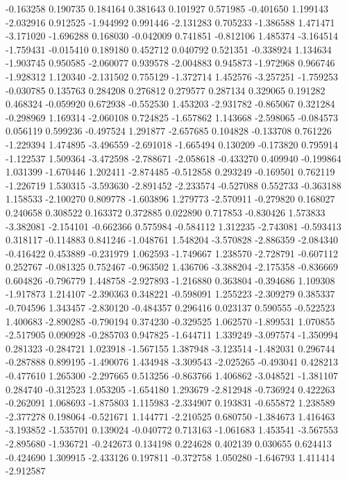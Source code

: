 -0.163258
0.190735
0.184164
0.381643
0.101927
0.571985
-0.401650
1.199143
-2.032916
0.912525
-1.944992
0.991446
-2.131283
0.705233
-1.386588
1.471471
-3.171020
-1.696288
0.168030
-0.042009
0.741851
-0.812106
1.485374
-3.164514
-1.759431
-0.015410
0.189180
0.452712
0.040792
0.521351
-0.338924
1.134634
-1.903745
0.950585
-2.060077
0.939578
-2.004883
0.945873
-1.972968
0.966746
-1.928312
1.120340
-2.131502
0.755129
-1.372714
1.452576
-3.257251
-1.759253
-0.030785
0.135763
0.284208
0.276812
0.279577
0.287134
0.329065
0.191282
0.468324
-0.059920
0.672938
-0.552530
1.453203
-2.931782
-0.865067
0.321284
-0.298969
1.169314
-2.060108
0.724825
-1.657862
1.143668
-2.598065
-0.084573
0.056119
0.599236
-0.497524
1.291877
-2.657685
0.104828
-0.133708
0.761226
-1.229394
1.474895
-3.496559
-2.691018
-1.665494
0.130209
-0.173820
0.795914
-1.122537
1.509364
-3.472598
-2.788671
-2.058618
-0.433270
0.409940
-0.199864
1.031399
-1.670446
1.202411
-2.874485
-0.512858
0.293249
-0.169501
0.762119
-1.226719
1.530315
-3.593630
-2.891452
-2.233574
-0.527088
0.552733
-0.363188
1.158533
-2.100270
0.809778
-1.603896
1.279773
-2.570911
-0.279820
0.168027
0.240658
0.308522
0.163372
0.372885
0.022890
0.717853
-0.830426
1.573833
-3.382081
-2.154101
-0.662366
0.575984
-0.584112
1.312235
-2.743081
-0.593413
0.318117
-0.114883
0.841246
-1.048761
1.548204
-3.570828
-2.886359
-2.084340
-0.416422
0.453889
-0.231979
1.062593
-1.749667
1.238570
-2.728791
-0.607112
0.252767
-0.081325
0.752467
-0.963502
1.436706
-3.388204
-2.175358
-0.836669
0.604826
-0.796779
1.448758
-2.927893
-1.216880
0.363804
-0.394686
1.109308
-1.917873
1.214107
-2.390363
0.348221
-0.598091
1.255223
-2.309279
0.385337
-0.704596
1.343457
-2.830120
-0.484357
0.296416
0.023137
0.590555
-0.522523
1.400683
-2.890285
-0.790194
0.374230
-0.329525
1.062570
-1.899531
1.070855
-2.517905
0.090928
-0.285703
0.947825
-1.644711
1.339249
-3.097574
-1.350994
0.281323
-0.284721
1.023918
-1.567155
1.387948
-3.123514
-1.482031
0.296744
-0.287888
0.899195
-1.490076
1.434948
-3.309543
-2.025265
-0.493041
0.428213
-0.477610
1.265300
-2.297665
0.513256
-0.863766
1.406862
-3.048521
-1.381107
0.284740
-0.312523
1.053205
-1.654180
1.293679
-2.812948
-0.736924
0.422263
-0.262091
1.068693
-1.875803
1.115983
-2.334907
0.193831
-0.655872
1.238589
-2.377278
0.198064
-0.521671
1.144771
-2.210525
0.680750
-1.384673
1.416463
-3.193852
-1.535701
0.139024
-0.040772
0.713163
-1.061683
1.453541
-3.567553
-2.895680
-1.936721
-0.242673
0.134198
0.224628
0.402139
0.030655
0.624413
-0.424690
1.309915
-2.433126
0.197811
-0.372758
1.050280
-1.646793
1.411414
-2.912587

